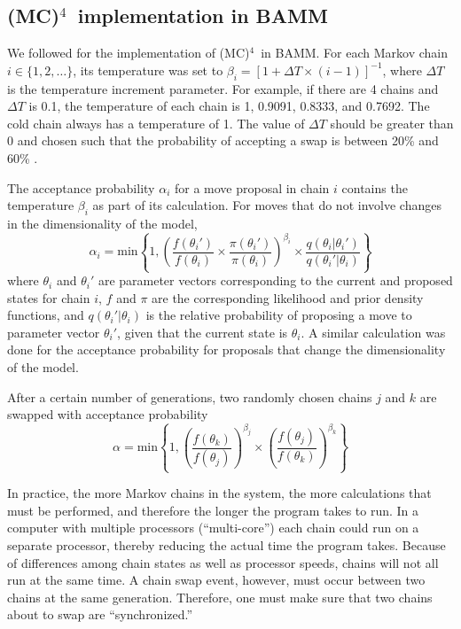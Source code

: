 \documentclass[12pt]{article}
\newcommand{\MCMCMCMC}{(MC)$^{4}$}
\begin{document}
\subsection*{\MCMCMCMC\ implementation in BAMM}

We followed \citet{alt04} for the implementation of \MCMCMCMC\ in BAMM.
%
For each Markov chain $i \in \{1, 2, \dots\}$, its temperature was set to
$\beta_i = [1 + \Delta T \times (i - 1)]^{-1}$,
where $\Delta T$ is the temperature increment parameter.
%
For example, if there are 4 chains and $\Delta T$ is 0.1,
the temperature of each chain is 1, 0.9091, 0.8333, and 0.7692.
%
The cold chain always has a temperature of 1.
%
The value of $\Delta T$ should be greater than 0
and chosen such that the probability of accepting a swap
is between 20\% and 60\% \citep{alt04}.


The acceptance probability $\alpha_i$ for a move proposal
in chain $i$ contains the temperature $\beta_i$ as part of its calculation.
%
For moves that do not involve changes in the dimensionality of the model,
\[\alpha_i = \text{min}\left\{ 1,
    \left(
    \frac{f(\theta_i')}{f(\theta_i)} \times
    \frac{\pi(\theta_i')}{\pi(\theta_i)}
    \right)^{\beta_i} \times
    \frac{q(\theta_i | \theta_i')}{q(\theta_i' | \theta_i)}
\right\}\]
where $\theta_i$ and $\theta_i'$ are parameter vectors
corresponding to the current and proposed states for chain $i$,
$f$ and $\pi$ are the corresponding likelihood and prior density functions,
and $q(\theta_i' | \theta_i)$ is the relative probability
of proposing a move to parameter vector $\theta_i'$,
given that the current state is $\theta_i$.
%
A similar calculation was done for the acceptance probability for proposals
that change the dimensionality of the model.

After a certain number of generations, two randomly chosen chains $j$ and $k$
are swapped with acceptance probability
\[\alpha = \text{min}\left\{ 1,
    \left(\frac{f(\theta_k)}{f(\theta_j)}\right)^{\beta_j} \times
    \left(\frac{f(\theta_j)}{f(\theta_k)}\right)^{\beta_k}
\right\}\]


In practice, the more Markov chains in the system,
the more calculations that must be performed,
and therefore the longer the program takes to run.
%
In a computer with multiple processors (``multi-core'')
each chain could run on a separate processor,
thereby reducing the actual time the program takes.
%
Because of differences among chain states as well as processor speeds,
chains will not all run at the same time.
%
A chain swap event, however, must occur between two chains
at the same generation.
%
Therefore, one must make sure that two chains about to swap
are ``synchronized.''
\end{document}
